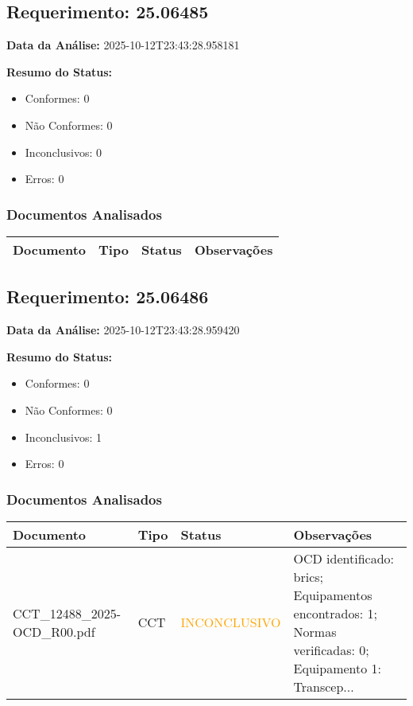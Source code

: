\documentclass[12pt,a4paper]{article}
\begin{document}
\subsection{Requerimento: 25.06485}

\textbf{Data da Análise:} 2025-10-12T23:43:28.958181

\textbf{Resumo do Status:}
\begin{itemize}
    \item Conformes: 0
    \item Não Conformes: 0
    \item Inconclusivos: 0
    \item Erros: 0
\end{itemize}

\subsubsection{Documentos Analisados}

\begin{longtable}{|p{4cm}|p{2cm}|p{2cm}|p{6cm}|}
\hline
\textbf{Documento} & \textbf{Tipo} & \textbf{Status} & \textbf{Observações} \\
\hline
\endhead
\end{longtable}


\subsection{Requerimento: 25.06486}

\textbf{Data da Análise:} 2025-10-12T23:43:28.959420

\textbf{Resumo do Status:}
\begin{itemize}
    \item Conformes: 0
    \item Não Conformes: 0
    \item Inconclusivos: 1
    \item Erros: 0
\end{itemize}

\subsubsection{Documentos Analisados}

\begin{longtable}{|p{4cm}|p{2cm}|p{2cm}|p{6cm}|}
\hline
\textbf{Documento} & \textbf{Tipo} & \textbf{Status} & \textbf{Observações} \\
\hline
\endhead
CCT\_12488\_2025-OCD\_R00.pdf & CCT & \textcolor{orange}{INCONCLUSIVO} & OCD identificado: brics; Equipamentos encontrados: 1; Normas verificadas: 0; Equipamento 1: Transcep... \\
\hline
\end{longtable}
\end{document}
